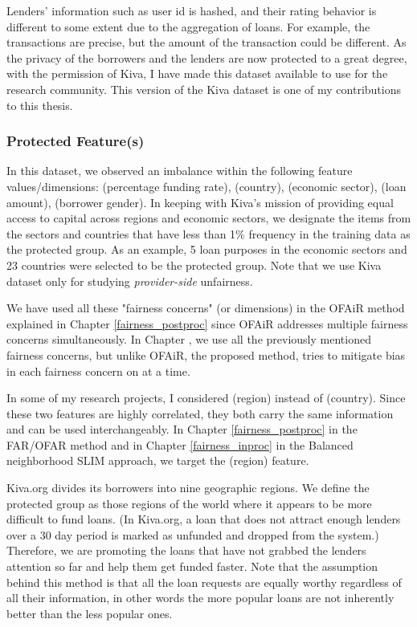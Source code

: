     Lenders' information such as user id is hashed, and their rating behavior is different to some extent due to the aggregation of loans. For example, the transactions are precise, but the amount of the transaction could be different.
    As the privacy of the borrowers and the lenders are now protected to a great degree, with the permission of Kiva, I have made this dataset available to use for the research community. This version of the Kiva dataset is one of my contributions to this thesis.


        \subsubsection{Protected Feature(s)}
        In this dataset, we observed an imbalance within the following feature values/dimensions: (percentage funding rate), (country), (economic sector), (loan amount), (borrower gender). In keeping with Kiva's mission of providing equal access to capital across regions and economic sectors, we designate the items from the sectors and countries that have less than 1\% frequency in the training data as the protected group. As an example, 5 loan purposes in the economic sectors and 23 countries were selected to be the protected group. Note that we use Kiva dataset only for studying \textit{provider-side} unfairness. %
        
        We have used all these "fairness concerns" (or dimensions) in the OFAiR method explained in Chapter \ref{fairness_postproc} since OFAiR addresses multiple fairness concerns simultaneously. In Chapter , we use all the previously mentioned fairness concerns, but unlike OFAiR, the proposed method, tries to mitigate bias in each fairness concern on at a time.
        
        In some of my research projects, I considered (region) instead of (country). Since these two features are highly correlated, they both carry the same information and can be used interchangeably. In Chapter \ref{fairness_postproc} in the FAR/OFAR method and in Chapter \ref{fairness_inproc} in the Balanced neighborhood SLIM approach, we target the (region) feature.
        
        Kiva.org divides its borrowers into nine geographic regions. We define the protected group as those regions of the world where it appears to be more difficult to fund loans. (In Kiva.org, a loan that does not attract enough lenders over a 30 day period is marked as unfunded and dropped from the system.) Therefore, we are promoting the loans that have not grabbed the lenders attention so far and help them get funded faster. Note that the assumption behind this method is that all the loan requests are equally worthy regardless of all their information, in other words the more popular loans are not inherently better than the less popular ones.
        
